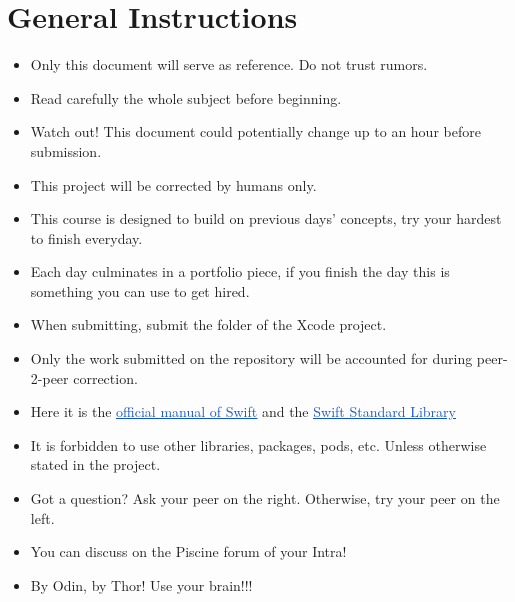 \documentclass[12pt]{report}
\begin{document}
\section*{General Instructions}
\begin{itemize}
	\item Only this document will serve as reference. Do not trust rumors.\par

	\item Read carefully the whole subject before beginning.\par

	\item Watch out! This document could potentially change up to an hour before submission.\par

	\item This project will be corrected by humans only.\par

	\item This course is designed to build on previous days’ concepts, try your hardest to finish everyday.\par

	\item Each day culminates in a portfolio piece, if you finish the day this is something you can use to get hired.\par

	\item When submitting, submit the folder of the Xcode project.\par

	\item Only the work submitted on the repository will be accounted for during peer-2-peer correction.\par

	\item Here it is the \href{https://docs.swift.org/swift-book/}{\textcolor[HTML]{1155CC}{\uline{official manual of Swift}}} and the \href{https://developer.apple.com/documentation/swift/swift_standard_library}{\textcolor[HTML]{1155CC}{\uline{Swift Standard Library}}}\par

	\item It is forbidden to use other libraries, packages, pods, etc. Unless otherwise stated in the project.\par

	\item Got a question? Ask your peer on the right. Otherwise, try your peer on the left.\par

	\item You can discuss on the Piscine forum of your Intra!\par

	\item By Odin, by Thor! Use your brain!!!
\end{itemize}\par
\end{document}
